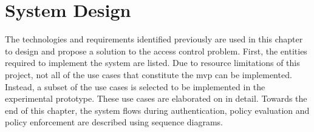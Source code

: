 \section{System Design}\label{sec:design}

The technologies and requirements identified previously are used in this chapter to design and propose a solution to the access control problem. First, the entities required to implement the system are listed. Due to resource limitations of this project, not all of the use cases that constitute the \acrshort{mvp} can be implemented. Instead, a subset of the use cases is selected to be implemented in the experimental prototype. These use cases are elaborated on in detail. Towards the end of this chapter, the system flows during authentication, policy evaluation and policy enforcement are described using sequence diagrams.




